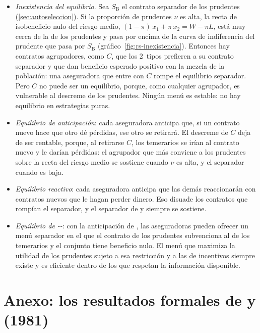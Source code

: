 \documentclass[11pt]{article}
\begin{document}
\begin{itemize}
\item \emph{Inexistencia del equilibrio}. Sea $S_{\mathrm{B}}$ el contrato separador de los prudentes (\ref{sec:autoseleccion}). Si la proporción de prudentes $\nu$ es alta, la recta de isobeneficio nulo del riesgo medio, $(1-\overline{\pi})\,x_1+\overline{\pi}\,x_2=\overline{W}-\overline{\pi}L$, está muy cerca de la de los prudentes y pasa por encima de la curva de indiferencia del prudente que pasa por $S_{\mathrm{B}}$ (gráfico~\ref{fig:rs-inexistencia}). Entonces hay contratos agrupadores, como $C$, que los 2~tipos prefieren a su contrato separador y que dan beneficio esperado positivo con la mezcla de la población: una aseguradora que entre con $C$ rompe el equilibrio separador. Pero $C$ no puede ser un equilibrio, porque, como cualquier agrupador, es vulnerable al descreme de los prudentes. Ningún menú es estable: no hay equilibrio en estrategias puras\nocite{RothschildStiglitz1976Equilibrium}.
\item \emph{Equilibrio de anticipación}\nocite{Wilson1977Model}: cada aseguradora anticipa que, si un contrato nuevo hace que otro dé pérdidas, ese otro se retirará. El descreme de $C$ deja de ser rentable, porque, al retirarse $C$, los temerarios se irían al contrato nuevo y le darían pérdidas: el agrupador que más conviene a los prudentes sobre la recta del riesgo medio se sostiene cuando $\nu$ es alta, y el separador cuando es baja.
\item \emph{Equilibrio reactivo}\nocite{Riley1979Informational}: cada aseguradora anticipa que las demás reaccionarán con contratos nuevos que le hagan perder dinero. Eso disuade los contratos que rompían el separador, y el separador de  y  siempre se sostiene.
\item \emph{Equilibrio de --}\nocite{Miyazaki1977Rat,Spence1978Product}: con la anticipación de , las aseguradoras pueden ofrecer un menú separador en el que el contrato de los prudentes subvenciona al de los temerarios y el conjunto tiene beneficio nulo. El menú que maximiza la utilidad de los prudentes sujeto a esa restricción y a las de incentivos siempre existe y es eficiente dentro de los que respetan la información disponible.
\end{itemize}

\section{Anexo: los resultados formales de  y  (1981)}\label{anexo:stiglitz-weiss}
\end{document}
